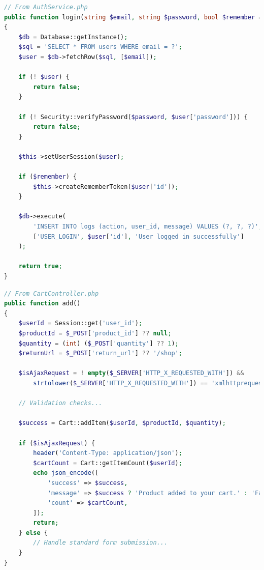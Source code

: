 \documentclass[14pt,a4paper]{article}
\begin{document}
\begin{lstlisting}[language=PHP, caption=User authentication with session management]
// From AuthService.php
public function login(string $email, string $password, bool $remember = false): bool
{
    $db = Database::getInstance();
    $sql = 'SELECT * FROM users WHERE email = ?';
    $user = $db->fetchRow($sql, [$email]);

    if (! $user) {
        return false;
    }

    if (! Security::verifyPassword($password, $user['password'])) {
        return false;
    }

    $this->setUserSession($user);

    if ($remember) {
        $this->createRememberToken($user['id']);
    }

    $db->execute(
        'INSERT INTO logs (action, user_id, message) VALUES (?, ?, ?)',
        ['USER_LOGIN', $user['id'], 'User logged in successfully']
    );

    return true;
}
\end{lstlisting}

\begin{lstlisting}[language=PHP, caption=Shopping cart functionality]
// From CartController.php
public function add()
{
    $userId = Session::get('user_id');
    $productId = $_POST['product_id'] ?? null;
    $quantity = (int) ($_POST['quantity'] ?? 1);
    $returnUrl = $_POST['return_url'] ?? '/shop';

    $isAjaxRequest = ! empty($_SERVER['HTTP_X_REQUESTED_WITH']) &&
        strtolower($_SERVER['HTTP_X_REQUESTED_WITH']) == 'xmlhttprequest';

    // Validation checks...
    
    $success = Cart::addItem($userId, $productId, $quantity);

    if ($isAjaxRequest) {
        header('Content-Type: application/json');
        $cartCount = Cart::getItemCount($userId);
        echo json_encode([
            'success' => $success,
            'message' => $success ? 'Product added to your cart.' : 'Failed to add product to cart.',
            'count' => $cartCount,
        ]);
        return;
    } else {
        // Handle standard form submission...
    }
}
\end{lstlisting}
\end{document}
